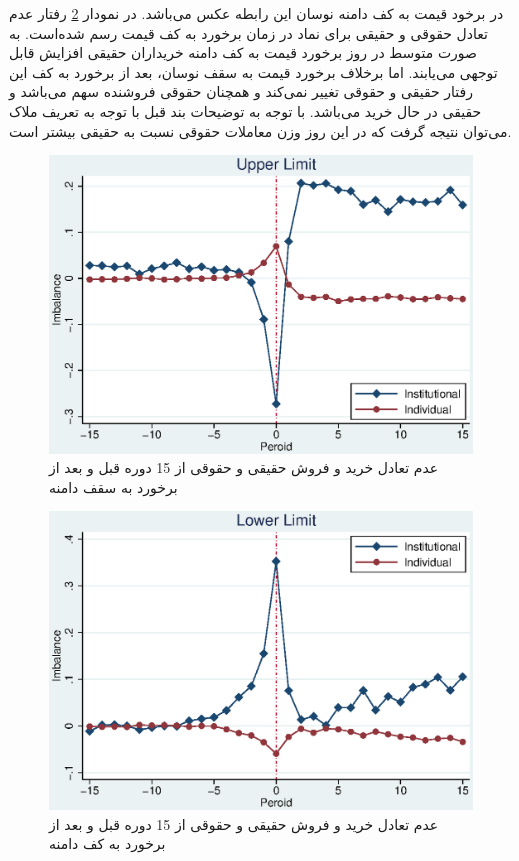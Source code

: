 \documentclass[12pt]{article}
\begin{document}
 در برخود قیمت به کف دامنه نوسان این رابطه عکس می‌باشد. در نمودار
 \ref{g7}
 رفتار عدم تعادل حقوقی و حقیقی برای نماد در زمان برخورد به کف قیمت رسم شده‌است. به صورت متوسط در روز برخورد قیمت به کف دامنه خریداران حقیقی افزایش قابل توجهی می‌یابند. اما برخلاف برخورد قیمت به سقف نوسان، بعد از برخورد به کف این رفتار حقیقی و حقوقی تغییر نمی‌کند و همچنان حقوقی فروشنده سهم می‌باشد و حقیقی در حال خرید می‌باشد. با توجه به توضیحات بند قبل با توجه به تعریف ملاک می‌توان نتیجه گرفت که در این روز وزن معاملات حقوقی نسبت به حقیقی بیشتر است.
 
\begin{figure}[htbp]
\centering
\includegraphics[width=0.8\columnwidth]{UI.eps}
\caption{عدم تعادل خرید و فروش حقیقی و حقوقی از 15 دوره قبل  و بعد از برخورد  به سقف دامنه }
\label{g6}
\end{figure}
\begin{figure}[htbp]
\centering
\includegraphics[width=0.8\columnwidth]{LI.eps}
\caption{عدم تعادل خرید و فروش حقیقی و حقوقی از 15 دوره قبل   و بعد از برخورد به کف دامنه }
\label{g7}
\end{figure}
\end{document}
